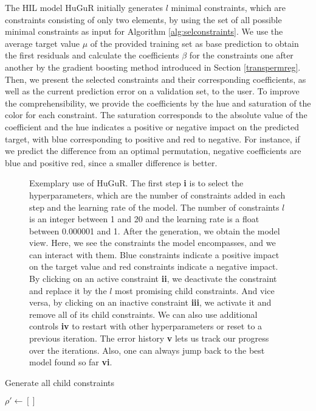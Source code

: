The HIL model HuGuR initially generates $l$ minimal constraints, which are constraints consisting of only two elements, by using the set of all possible minimal constraints as input for Algorithm \ref{alg:selconstraints}. We use the average target value $\mu$ of the provided training set as base prediction to obtain the first residuals and calculate the coefficients $\beta$ for the constraints one after another by the gradient boosting method introduced in Section \ref{transpermreg}. Then, we present the selected constraints and their corresponding coefficients, as well as the current prediction error on a validation set, to the user. To improve the comprehensibility, we provide the coefficients by the hue and saturation of the color for each constraint. The saturation corresponds to the absolute value of the coefficient and the hue indicates a positive or negative impact on the predicted target, with blue corresponding to positive and red to negative. For instance, if we predict the difference from an optimal permutation, negative coefficients are blue and positive red, since a smaller difference is better.

\begin{figure}[!htbp]
    \centering
    \caption{Exemplary use of HuGuR. The first step \textbf{i} is to select the hyperparameters, which are the number of constraints added in each step and the learning rate of the model. The number of constraints $l$ is an integer between 1 and 20 and the learning rate is a float between 0.000001 and 1. After the generation, we obtain the model view. Here, we see the constraints the model encompasses, and we can interact with them. Blue constraints indicate a positive impact on the target value and red constraints indicate a negative impact. By clicking on an active constraint \textbf{ii}, we deactivate the constraint and replace it by the $l$ most promising child constraints. And vice versa, by clicking on an inactive constraint \textbf{iii}, we activate it and remove all of its child constraints. We can also use additional controls \textbf{iv} to restart with other hyperparameters or reset to a previous iteration. The error history \textbf{v} lets us track our progress over the iterations. Also, one can always jump back to the best model found so far \textbf{vi}.}
    \label{fig:interface}
\end{figure}

\begin{algorithm}[t!]
\caption{Generate all child constraints}\label{alg:genchild}
$\rho' \gets []$\;
\end{algorithm}

